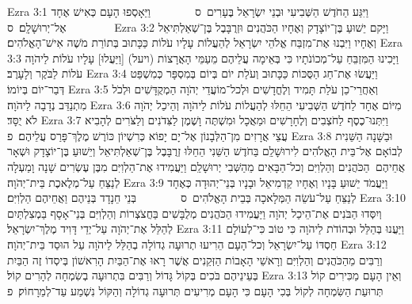 Ezra 3:1	וַיִּגַּע הַחֹדֶשׁ הַשְּׁבִיעִי וּבְנֵי יִשְׂרָאֵל בֶּעָרִים {ס}        וַיֵּאָסְפוּ הָעָם כְּאִישׁ אֶחָד אֶל־יְרוּשָׁלָ͏ִם׃ {ס}        
Ezra 3:2	וַיָּקם יֵשׁוּעַ בֶּן־יוֹצָדָק וְאֶחָיו הַכֹּהֲנִים וּזְרֻבָּבֶל בֶּן־שְׁאַלְתִּיאֵל וְאֶחָיו וַיִּבְנוּ אֶת־מִזְבַּח אֱלֹהֵי יִשְׂרָאֵל לְהַעֲלוֹת עָלָיו עֹלוֹת כַּכָּתוּב בְּתוֹרַת מֹשֶׁה אִישׁ־הָאֱלֹהִים׃
Ezra 3:3	וַיָּכִינוּ הַמִּזְבֵּחַ עַל־מְכוֹנֹתָיו כִּי בְּאֵימָה עֲלֵיהֶם מֵעַמֵּי הָאֲרָצוֹת (ויעל) [וַיַּעֲלוּ] עָלָיו עֹלוֹת לַיהֹוָה עֹלוֹת לַבֹּקֶר וְלָעָרֶב׃
Ezra 3:4	וַיַּעֲשׂוּ אֶת־חַג הַסֻּכּוֹת כַּכָּתוּב וְעֹלַת יוֹם בְּיוֹם בְּמִסְפָּר כְּמִשְׁפַּט דְּבַר־יוֹם בְּיוֹמוֹ׃
Ezra 3:5	וְאַחֲרֵי־כֵן עֹלַת תָּמִיד וְלֶחֳדָשִׁים וּלְכל־מוֹעֲדֵי יְהֹוָה הַמְקֻדָּשִׁים וּלְכֹל מִתְנַדֵּב נְדָבָה לַיהֹוָה׃
Ezra 3:6	מִיּוֹם אֶחָד לַחֹדֶשׁ הַשְּׁבִיעִי הֵחֵלּוּ לְהַעֲלוֹת עֹלוֹת לַיהֹוָה וְהֵיכַל יְהֹוָה לֹא יֻסָּד׃
Ezra 3:7	וַיִּתְּנוּ־כֶסֶף לַחֹצְבִים וְלֶחָרָשִׁים וּמַאֲכָל וּמִשְׁתֶּה וָשֶׁמֶן לַצִּדֹנִים וְלַצֹּרִים לְהָבִיא עֲצֵי אֲרָזִים מִן־הַלְּבָנוֹן אֶל־יָם יָפוֹא כְּרִשְׁיוֹן כּוֹרֶשׁ מֶלֶךְ־פָּרַס עֲלֵיהֶם׃ {פ}
Ezra 3:8	וּבַשָּׁנָה הַשֵּׁנִית לְבוֹאָם אֶל־בֵּית הָאֱלֹהִים לִירוּשָׁלַ͏ִם בַּחֹדֶשׁ הַשֵּׁנִי הֵחֵלּוּ זְרֻבָּבֶל בֶּן־שְׁאַלְתִּיאֵל וְיֵשׁוּעַ בֶּן־יוֹצָדָק וּשְׁאָר אֲחֵיהֶם  הַכֹּהֲנִים וְהַלְוִיִּם וְכל־הַבָּאִים מֵהַשְּׁבִי יְרוּשָׁלַ͏ִם וַיַּעֲמִידוּ אֶת־הַלְוִיִּם מִבֶּן עֶשְׂרִים שָׁנָה וָמַעְלָה לְנַצֵּחַ עַל־מְלֶאכֶת בֵּית־יְהֹוָה׃
Ezra 3:9	וַיַּעֲמֹד יֵשׁוּעַ בָּנָיו וְאֶחָיו קַדְמִיאֵל וּבָנָיו בְּנֵי־יְהוּדָה כְּאֶחָד לְנַצֵּחַ עַל־עֹשֵׂה הַמְּלָאכָה בְּבֵית הָאֱלֹהִים {ס}        בְּנֵי חֵנָדָד בְּנֵיהֶם וַאֲחֵיהֶם הַלְוִיִּם׃
Ezra 3:10	וְיִסְּדוּ הַבֹּנִים אֶת־הֵיכַל יְהֹוָה וַיַּעֲמִידוּ הַכֹּהֲנִים מְלֻבָּשִׁים בַּחֲצֹצְרוֹת וְהַלְוִיִּם בְּנֵי־אָסָף בַּמְצִלְתַּיִם לְהַלֵּל אֶת־יְהֹוָה עַל־יְדֵי דָּוִיד מֶלֶךְ־יִשְׂרָאֵל׃
Ezra 3:11	וַיַּעֲנוּ בְּהַלֵּל וּבְהוֹדֹת לַיהֹוָה כִּי טוֹב כִּי־לְעוֹלָם חַסְדּוֹ עַל־יִשְׂרָאֵל וְכל־הָעָם הֵרִיעוּ תְרוּעָה גְדוֹלָה בְהַלֵּל לַיהֹוָה עַל הוּסַד בֵּית־יְהֹוָה׃
Ezra 3:12	וְרַבִּים מֵהַכֹּהֲנִים וְהַלְוִיִּם וְרָאשֵׁי הָאָבוֹת הַזְּקֵנִים אֲשֶׁר רָאוּ אֶת־הַבַּיִת הָרִאשׁוֹן בְּיסְדוֹ זֶה הַבַּיִת בְּעֵינֵיהֶם בֹּכִים בְּקוֹל גָּדוֹל וְרַבִּים בִּתְרוּעָה בְשִׂמְחָה לְהָרִים קוֹל׃
Ezra 3:13	וְאֵין הָעָם מַכִּירִים קוֹל תְּרוּעַת הַשִּׂמְחָה לְקוֹל בְּכִי הָעָם כִּי הָעָם מְרִיעִים תְּרוּעָה גְדוֹלָה וְהַקּוֹל נִשְׁמַע עַד־לְמֵרָחוֹק׃ {פ}
